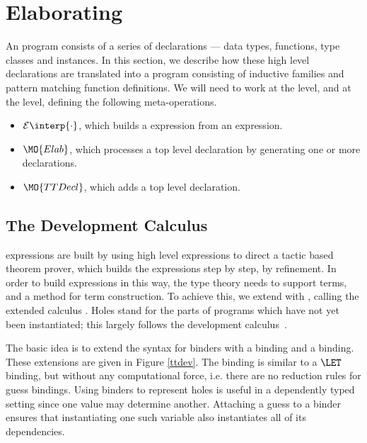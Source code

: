 \newcommand{\ttinterp}[1]{\mathcal{E}\interp{#1}}
\newcommand{\uninterp}[1]{\mathcal{T}\interp{#1}}

\section{Elaborating \Idris{}}

\label{sect:elaboration}

An \Idris{} program consists of a series of declarations --- data types,
functions, type classes and instances. In this section, we describe how these
high level declarations are translated into a \TT{} program consisting of
inductive families and pattern matching function definitions. We will need to
work at the  level, and at the  level,
defining the following meta-operations.

\begin{itemize}
\item $\ttinterp{\cdot}$, which builds a \TT{} expression from an \Idris{} expression.
\item $\MO{Elab}$, which processes a top level \Idris{} declaration by generating
one or more \TT{} declarations.
\item $\MO{TTDecl}$, which adds a top level \TT{} declaration.
\end{itemize}


\subsection{The Development Calculus \TTdev}

\TT{} expressions are built by using high level \Idris{} expressions to
direct a tactic based theorem prover, which builds the \TT{} expressions
step by step, by refinement. In order to build expressions in this way,
the type theory needs to support
 terms, and a method for term construction. 
To achieve this, we extend \TT{} with ,
calling the extended calculus \TTdev{}.
Holes stand for the parts of programs which have not yet been
instantiated; this largely follows the \Oleg{} development
calculus~\cite{McBride1999}.

The basic idea is to extend the syntax for binders with a 
binding and a  binding. 
These extensions are given in Figure \ref{ttdev}.
The  binding is
similar to a $\LET$ binding, but without any computational force,
i.e. there are no reduction rules for guess bindings. 
Using binders to represent holes is useful in a dependently typed setting since
one value may determine another. Attaching a guess to a binder ensures that
instantiating one such variable also instantiates all of its dependencies. 

